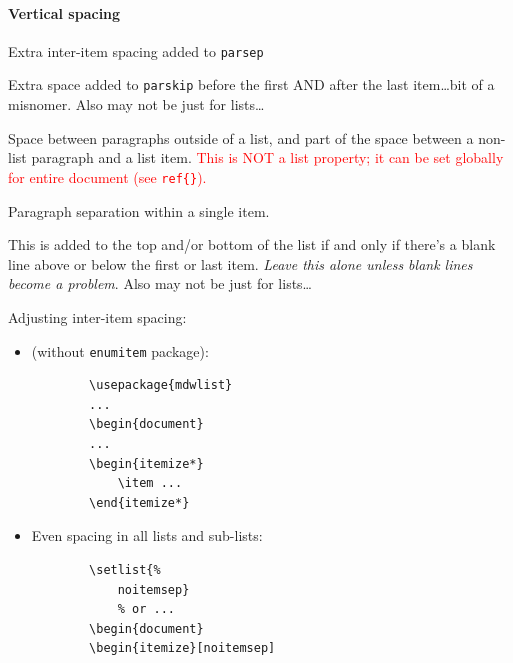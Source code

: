 \documentclass{article}
\begin{document}
\paragraph{Vertical spacing}
\begin{description}[labelindent=2cm, leftmargin=\labelindent]
    \item [headsep]
    \item [itemsep] Extra inter-item spacing added to \texttt{parsep}
    \item [topskip]
    \item [topmargin]
    \item [topsep] Extra space added to \texttt{parskip} before the first
        AND after the last item\ldots bit of a misnomer.
        Also may not be just for lists\ldots
    \item [parskip] Space between paragraphs outside of a list, and part of
        the space between a non-list paragraph and a list item.
        \textcolor{red}{This is NOT a list property; it can be set
        globally for entire document (see \SS{} \texttt{ref\{\}}).}
    \item [parsep] Paragraph separation within a single item.
    \item [partopsep] This is added to the top and/or bottom of the list
        if and only if there's a blank line above or below the first
        or last item. \emph{Leave this alone unless blank lines become a
        problem}. Also may not be just for lists\ldots
\end{description}

Adjusting inter-item spacing:
\begin{itemize}
    \item (without \texttt{enumitem} package):
        \begin{lstlisting}
        \usepackage{mdwlist}
        ...
        \begin{document}
        ...
        \begin{itemize*}
            \item ...
        \end{itemize*}
        \end{lstlisting}
    \item Even spacing in all lists and sub-lists:
        \begin{lstlisting}
        \setlist{%
            noitemsep}
            % or ...
        \begin{document}
        \begin{itemize}[noitemsep]
        \end{lstlisting}
\end{itemize}
\end{document}
